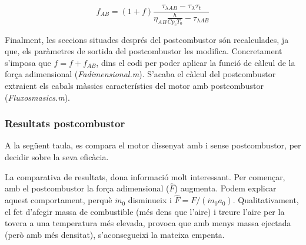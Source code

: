 \begin{equation}
	f_{AB}=(1+f)\frac{\tau_{\lambda AB}-\tau_{\lambda}\tau_t}{\eta_{AB}\frac{h}{Cp_cT_0}-\tau_{\lambda AB}}
\end{equation}
 
 
\noindent Finalment, les seccions situades després del postcombustor són recalculades, ja que, els paràmetres de sortida del postcombustor les modifica. Concretament s'imposa que $f = f +f_{AB}$, dins el codi per poder aplicar la funció de càlcul de la força adimensional (\textit{Fadimensional.m}). S'acaba el càlcul del postcombustor extraient els cabals màssics característics del motor amb postcombustor (\textit{Fluxosmasics.m}).

\subsubsection{Resultats postcombustor}
A la següent taula, es compara el motor dissenyat amb i sense postcombustor, per decidir sobre la seva eficàcia.
\begin{table}[H]
	\centering
	\label{ABres}
	\caption{Resultats d'implementar el postcombustor.}
\end{table}



\noindent La comparativa de resultats, dona informació molt interessant. Per començar, amb el postcombustor la força adimensional ($\hat{F}$)  augmenta. Podem explicar aquest comportament, perquè $ \dot{m}_0$ disminueix i $\hat{F}=F/(\dot{m}_0a_0)$. Qualitativament, el fet d'afegir massa de combustible (més dens que l'aire) i treure l'aire per la tovera a una temperatura més elevada, provoca que amb menys massa ejectada (però amb més densitat), s'aconsegueixi la mateixa empenta.

